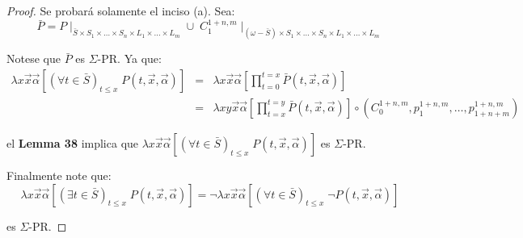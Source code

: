   \begin{proof}
    \PN Se probará solamente el inciso (a). Sea:
    \[
      \bar{P} = P \mid_{\bar{S} \times S_{1} \times \dotsc \times S_{n} \times L_{1} \times \dotsc \times L_{m}} \cup \;
      C_{1}^{1+n,m} \mid_{(\omega -\bar{S}) \times S_{1} \times \dotsc \times S_{n} \times L_{1} \times \dotsc \times
      L_{m}}
    \]

    \PN Notese que $\bar{P}$ es $\Sigma$-PR. Ya que:
    \begin{eqnarray*}
      \lambda x\vec{x}\vec{\alpha}\left[(\forall t \in \bar{S})_{t\leq x} \; P(t,\vec{x},\vec{\alpha})\right]
        &=& \lambda x\vec{x}\vec{\alpha}\left[\prod\limits_{t=0}^{t=x}\bar{P}(t,\vec{x},\vec{\alpha})\right] \\
      &=& \lambda xy\vec{x}\vec{\alpha}\left[\prod\limits_{t=x}^{t=y} \bar{P}(t,\vec{x},\vec{\alpha})\right]
        \circ \left(C_{0}^{1+n,m}, p_{1}^{1+n,m}, \dotsc, p_{1+n+m}^{1+n,m}\right)
    \end{eqnarray*}

    \PN el \textbf{Lemma 38} implica que $\lambda x\vec{x}\vec{\alpha}\left[(\forall t\in \bar{S})_{t\leq x} \;
    P(t,\vec{x},\vec{\alpha})\right]$ es $\Sigma$-PR.

    \PN Finalmente note que:
    \[
      \lambda x\vec{x}\vec{\alpha}\left[(\exists t \in \bar{S})_{t\leq x} \; P(t,\vec{x},\vec{\alpha})\right] = \lnot
      \lambda x\vec{x}\vec{\alpha}\left[(\forall t \in \bar{S})_{t\leq x} \; \lnot P(t,\vec{x},\vec{\alpha})\right]
    \]

    \PN es $\Sigma$-PR.
  \end{proof}

